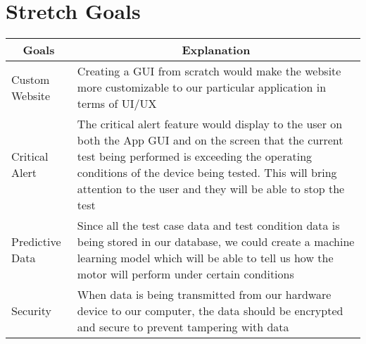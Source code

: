 \documentclass{article}
\begin{document}
\section{Stretch Goals}
    \begin{table}[H]
        \centering
        \begin{tabular}{|p{4cm}|p{8cm}|}
        \hline
        \multicolumn{1}{|c|}{\textbf{Goals}} & \multicolumn{1}{c|}{\textbf{Explanation}} 
        \\ \hline
        Custom Website
        &  Creating a GUI from scratch would make the website more customizable to our particular application in terms of UI/UX   
        \newline                              
        \\ \hline
        Critical Alert                              
        & The critical alert feature would display to the user on both the App GUI and on the screen that the current test being performed is exceeding the operating conditions of the device being tested. This will bring attention to the user and they will be able to stop the test
        \newline
        \\ \hline
        Predictive Data                              
        & Since all the test case data and test condition data is being stored in our database, we could create a machine learning model which will be able to tell us how the motor will perform under certain conditions                         
        \newline       
        \\ \hline
        Security                              
        & When data is being transmitted from our hardware device to our computer, the data should be encrypted and secure to prevent tampering with data
        \newline                           
        \\ \hline
        \end{tabular}
    \end{table}
\end{document}
